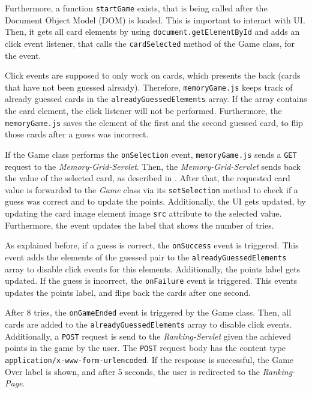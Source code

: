 Furthermore, a function \texttt{startGame} exists, that is being called after the Document Object Model (DOM) is loaded. This is important to interact with UI. Then, it gets all card elements by using \texttt{document.getElementById} and adds an click event listener, that calls the \texttt{cardSelected} method of the Game class, for the event.

Click events are supposed to only work on cards, which presents the back (cards that have not been guessed already). Therefore, \texttt{memoryGame.js} keeps track of already guessed cards in the \texttt{alreadyGuessedElements} array. If the array contains the card element, the click listener will not be performed.
Furthermore, the \texttt{memoryGame.js} saves the element of the first and the second guessed card, to flip those cards after a guess was incorrect.


If the Game class performs the \texttt{onSelection} event, \texttt{memoryGame.js} sends a \texttt{GET} request to the \textit{Memory-Grid-Servlet}. Then, the \textit{Memory-Grid-Servlet} sends back the value of the selected card, as described in . After that, the requested card value is forwarded to the \textit{Game} class via its \texttt{setSelection} method to check if a guess was correct and to update the points.
Additionally, the UI gets updated, by updating the card image element image \texttt{src} attribute to the selected value. Furthermore, the event updates the label that shows the number of tries.

As explained before, if a guess is correct, the \texttt{onSuccess} event is triggered. This event adds the elements of the guessed pair to the \texttt{alreadyGuessedElements} array to disable click events for this elements. Additionally, the points label gets updated.
If the guess is incorrect, the \texttt{onFailure} event is triggered. This events updates the points label, and flips back the cards after one second.

After 8 tries, the \texttt{onGameEnded} event is triggered by the Game class. Then, all cards are added to the \texttt{alreadyGuessedElements} array to disable click events. Additionally, a \texttt{POST} request is send to the \textit{Ranking-Servlet} given the achieved points in the game by the user. The \texttt{POST} request body has the content type \texttt{application/x-www-form-urlencoded}. If the response is successful, the Game Over label is shown, and after 5 seconds, the user is redirected to the \textit{Ranking-Page}.
